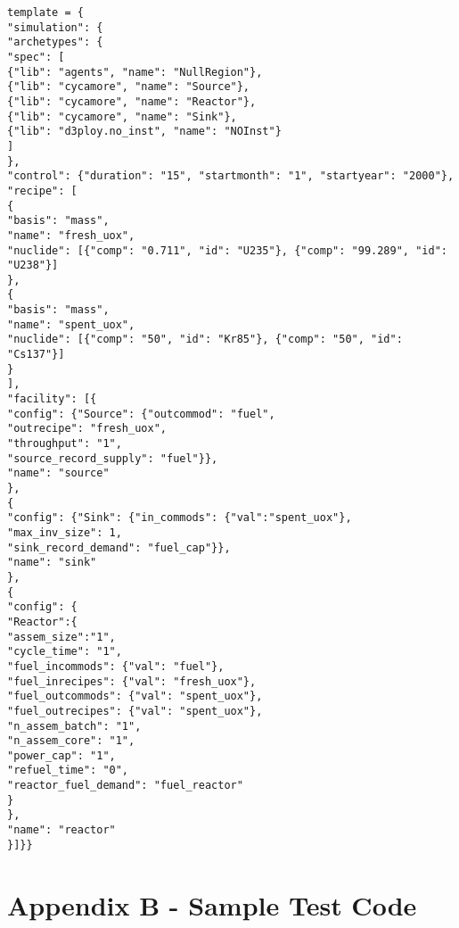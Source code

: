 \documentclass[11pt,letterpaper]{article}
\begin{document}
\begin{verbatim}
template = {
"simulation": {
"archetypes": {
"spec": [
{"lib": "agents", "name": "NullRegion"}, 
{"lib": "cycamore", "name": "Source"}, 
{"lib": "cycamore", "name": "Reactor"},
{"lib": "cycamore", "name": "Sink"},
{"lib": "d3ploy.no_inst", "name": "NOInst"}
]
}, 
"control": {"duration": "15", "startmonth": "1", "startyear": "2000"}, 
"recipe": [
{
"basis": "mass", 
"name": "fresh_uox", 
"nuclide": [{"comp": "0.711", "id": "U235"}, {"comp": "99.289", "id": "U238"}]
}, 
{
"basis": "mass", 
"name": "spent_uox", 
"nuclide": [{"comp": "50", "id": "Kr85"}, {"comp": "50", "id": "Cs137"}]
}
], 
"facility": [{
"config": {"Source": {"outcommod": "fuel",
"outrecipe": "fresh_uox",
"throughput": "1",
"source_record_supply": "fuel"}}, 
"name": "source"
},
{
"config": {"Sink": {"in_commods": {"val":"spent_uox"},
"max_inv_size": 1,
"sink_record_demand": "fuel_cap"}}, 
"name": "sink"
},
{
"config": {
"Reactor":{
"assem_size":"1",
"cycle_time": "1", 
"fuel_incommods": {"val": "fuel"}, 
"fuel_inrecipes": {"val": "fresh_uox"}, 
"fuel_outcommods": {"val": "spent_uox"}, 
"fuel_outrecipes": {"val": "spent_uox"}, 
"n_assem_batch": "1", 
"n_assem_core": "1", 
"power_cap": "1", 
"refuel_time": "0",
"reactor_fuel_demand": "fuel_reactor"
}
},
"name": "reactor"
}]}}
\end{verbatim}

\pagebreak
\section*{Appendix B - Sample Test Code }
\end{document}
